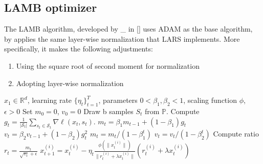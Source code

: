 \subsection{LAMB optimizer}
The LAMB algorithm, developed by \_ in [] uses ADAM as the base algorithm, by applies the same layer-wise normalization that LARS implements. More specifically, it makes the following adjustments:
\begin{enumerate}
    \item Using the square root of second moment for normalization
    \item Adopting layer-wise normalization
\end{enumerate}
\begin{minipage}[b]{.5\textwidth}
\begin{algorithm}[H]\small
	\caption{$LAMB$}
	\label{alg:lamb}
	\begin{algorithmic}
		 $x_1 \in \mathbb{R}^d$, learning rate $\{\eta_t\}_{t=1}^T$,  parameters $0 < \beta_{1}, \beta_2 < 1$, scaling function $\phi$, $\epsilon > 0$
		\STATE Set $m_{0} = 0$, $v_{0} = 0$
		\STATE Draw b samples $S_t$ from $\mathbb{P}$.
        \STATE Compute $g_t = \frac{1}{|\mathcal{S}_t|} \sum_{s_t \in \mathcal{S}_t}\nabla \ell(x_t, s_t)$.
		\STATE  $m_{t} = \beta_{1} m_{t-1} + (1 - \beta_{1}) g_{t}$ 
		\STATE  $v_{t} = \beta_{2} v_{t-1} + (1 - \beta_{2}) g_{t}^2$
		\STATE $m_t = m_t/(1 - {\beta}_1^t)$ 
        \STATE $v_t = v_t/(1 - {\beta}_2^t)$
		\STATE Compute ratio $r_t = \frac{m_t}{\sqrt{v_t} + \epsilon}$
		\STATE $x_{t+1}^{(i)} = x_{t}^{(i)} - \eta_t \frac{\phi(\|x_t^{(i)}\|)}{\|r_t^{(i)} + \lambda x_t^{(i)}\|} (r_t^{(i)} + \lambda x_t^{(i)})$
		\ENDFOR
	\end{algorithmic}
\end{algorithm}
\end{minipage}



